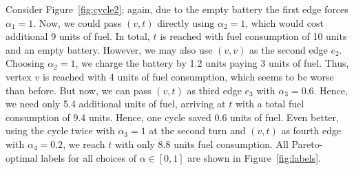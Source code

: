 \documentclass[a4paper]{scrartcl}
\begin{document}
Consider Figure~\ref{fig:cycle2}; again, due to the empty battery the first edge forces $\alpha_{1}=1$. Now, we could pass $(v,t)$ directly using $\alpha_2=1$, which would cost additional 9 units of fuel. In total, $t$ is reached with fuel consumption of 10 units  and an empty battery. However, we may also use $(v,v)$ as the second edge $e_2$. Choosing $\alpha_2=1$, we charge the battery by 1.2 units paying 3 units of fuel. Thus, vertex $v$ is reached with 4 units of fuel consumption, which seems to be worse than before. But now, we can pass $(v,t)$ as third edge $e_3$ with $\alpha_3=0.6$. Hence, we need only 5.4 additional units of fuel, arriving at $t$ with a total fuel consumption of 9.4 units. Hence, one cycle saved 0.6 units of fuel. Even better, using the cycle twice with $\alpha_3=1$ at the second turn and $(v,t)$ as fourth edge with $\alpha_4=0.2$, we reach $t$ with only 8.8 units fuel consumption. All Pareto-optimal labels for all choices of $\alpha\in[0,1]$ are shown in Figure~\ref{fig:labels}.  
\end{document}
